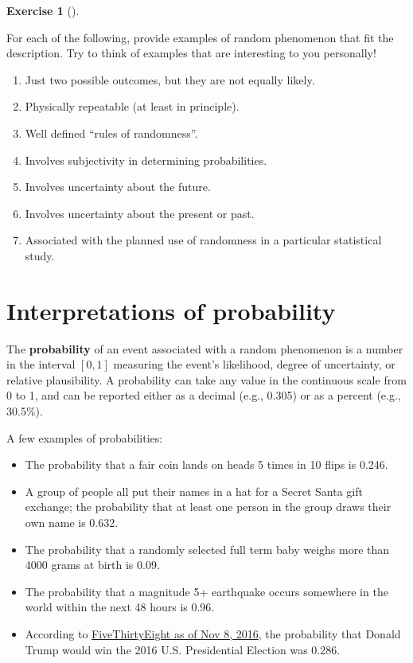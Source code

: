 \documentclass[
  letterpaper,
  DIV=11,
  numbers=noendperiod]{scrreprt}
\providecommand{\tightlist}{%
  \setlength{\itemsep}{0pt}\setlength{\parskip}{0pt}}
\theoremstyle{plain}
\theoremstyle{definition}
\theoremstyle{definition}
\newtheorem{exercise}{Exercise}[chapter]
\theoremstyle{definition}
\theoremstyle{remark}
\begin{document}
\begin{exercise}[]\protect\hypertarget{exr-random}{}\label{exr-random}

For each of the following, provide examples of random phenomenon that
fit the description. Try to think of examples that are interesting to
you personally!

\begin{enumerate}
\def\labelenumi{\arabic{enumi}.}
\tightlist
\item
  Just two possible outcomes, but they are not equally likely.
\item
  Physically repeatable (at least in principle).
\item
  Well defined ``rules of randomness''.
\item
  Involves subjectivity in determining probabilities.
\item
  Involves uncertainty about the future.
\item
  Involves uncertainty about the present or past.
\item
  Associated with the planned use of randomness in a particular
  statistical study.
\end{enumerate}

\end{exercise}

\section{Interpretations of probability}\label{sec-interpretations}

The \textbf{probability} of an event associated with a random phenomenon
is a number in the interval \([0, 1]\) measuring the event's likelihood,
degree of uncertainty, or relative plausibility. A probability can take
any value in the continuous scale from 0 to 1, and can be reported
either as a decimal (e.g., 0.305) or as a percent (e.g., 30.5\%).

A few examples of probabilities:

\begin{itemize}
\tightlist
\item
  The probability that a fair coin lands on heads 5 times in 10 flips is
  0.246.
\item
  A group of people all put their names in a hat for a Secret Santa gift
  exchange; the probability that at least one person in the group draws
  their own name is 0.632.
\item
  The probability that a randomly selected full term baby weighs more
  than 4000 grams at birth is 0.09.
\item
  The probability that a magnitude 5+ earthquake occurs somewhere in the
  world within the next 48 hours is 0.96.
\item
  According to
  \href{https://projects.fivethirtyeight.com/2016-election-forecast/}{FiveThirtyEight
  as of Nov 8, 2016}, the probability that Donald Trump would win the
  2016 U.S. Presidential Election was 0.286.
\end{itemize}
\end{document}
